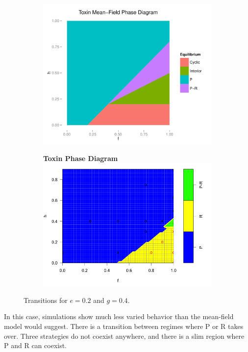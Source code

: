 \documentclass[12pt]{report}
\begin{document}
\begin{figure}
\centering
\begin{subfigure}[b]{0.8 \textwidth}
\centering
\includegraphics[width = 0.8 \linewidth]{Diagrams/toxin_phase-mf_e-0_2_g-0_4}
\caption{}
\end{subfigure}

\begin{subfigure}[b]{0.8 \textwidth}
\centering
\textbf{Toxin Phase Diagram}
\includegraphics[width = 0.8 \linewidth]{Diagrams/tm2_phase}
\caption{}
\end{subfigure}
\caption{Transitions for $e = 0.2$ and $g = 0.4$.}
\end{figure}

In this case, simulations show much less varied behavior than the mean-field model would suggest. There is a transition between regimes where P or R takes over. Three strategies do not coexist anywhere, and there is a slim region where P and R can coexist.
\end{document}
